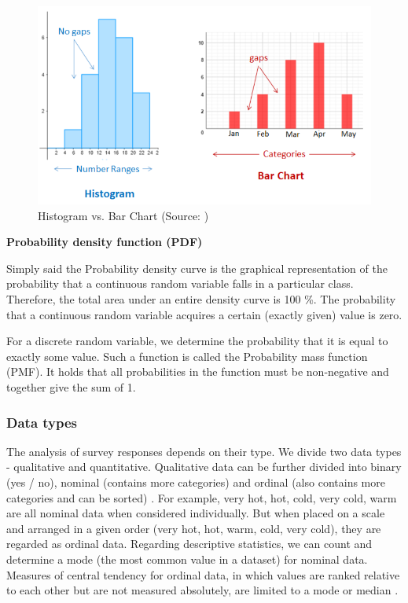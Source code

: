 \documentclass[a4paper,10pt,twoside]{article}
\begin{document}
\vspace{0.3cm}
\begin{figure}[hbt!]
\begin{center}
\includegraphics[width=12.5cm]{../pictures/histogram_barchart.png}
\caption[Histogram vs. Bar Chart]{Histogram vs. Bar Chart (Source: \cite{OnlineMathLearning})}
\label{fig:histogram_barchart}
\end{center}
\end{figure}

\bigskip
\noindent \textbf {Probability density function (PDF)}

\noindent Simply said the Probability density curve is the graphical
representation of the probability that a continuous random variable
falls in a particular class. Therefore, the total area under an entire
density curve is 100 \%. The probability that a continuous random
variable acquires a certain (exactly given) value is zero.

For a discrete random variable, we determine the probability that it
is equal to exactly some value. Such a function is called the
Probability mass function (PMF). It holds that all probabilities in
the function must be non-negative and together give the sum of 1.

\newpage
\vspace*{-1cm}
\subsubsection{Data types}

The analysis of survey responses depends on their type. We divide two
data types - qualitative and quantitative. Qualitative data can be
further divided into binary (yes / no), nominal (contains more
categories) and ordinal (also contains more categories and can be
sorted) \cite{minitab}. For example, very hot, hot, cold, very cold,
warm are all nominal data when considered individually. But when
placed on a scale and arranged in a given order (very hot, hot, warm,
cold, very cold), they are regarded as ordinal data. Regarding
descriptive statistics, we can count and determine a mode (the most
common value in a dataset) for nominal data. Measures of central
tendency for ordinal data, in which values are ranked relative to each
other but are not measured absolutely, are limited to a mode or median
\cite{ordinaldata}.
\end{document}
